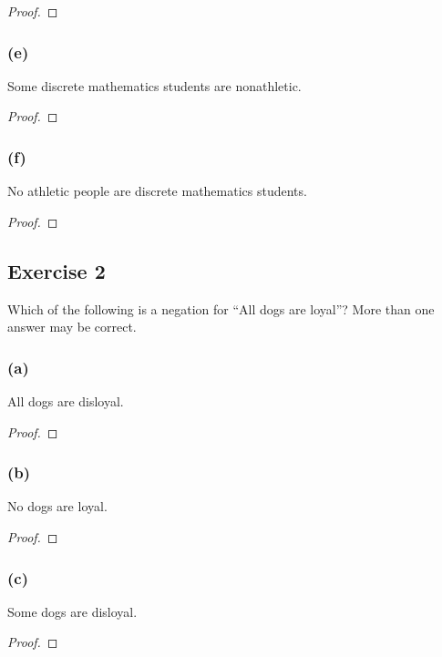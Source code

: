 \documentclass[14pt]{extarticle}
\begin{document}
\begin{proof}

\end{proof}

\subsubsection{(e)}
Some discrete mathematics students are nonathletic.

\begin{proof}

\end{proof}

\subsubsection{(f)}
No athletic people are discrete mathematics students.

\begin{proof}

\end{proof}

\subsection{Exercise 2}
Which of the following is a negation for “All dogs
are loyal”? More than one answer may be correct.

\subsubsection{(a)}
All dogs are disloyal.

\begin{proof}

\end{proof}

\subsubsection{(b)}
No dogs are loyal.

\begin{proof}

\end{proof}

\subsubsection{(c)}
Some dogs are disloyal.

\begin{proof}

\end{proof}
\end{document}
